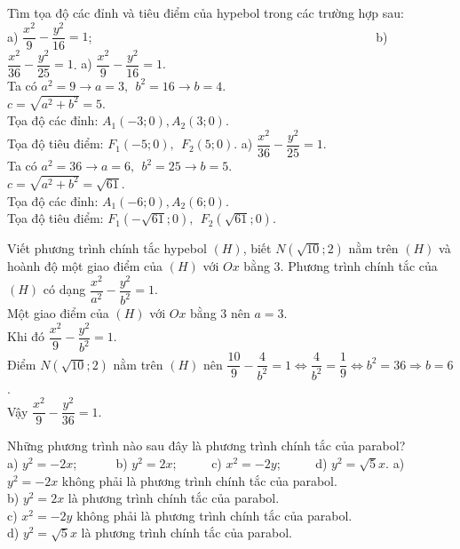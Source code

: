 \begin{bt}
	Tìm tọa độ các đỉnh và tiêu điểm của hypebol trong các trường hợp sau:\\
	a) $\dfrac{x^2}{9}-\dfrac{y^2}{16}=1$;~~~~~~~~~~~~~~~~~~~~~~~~~~~~~~~~~~~~~~~~~~~~~
	b) $\dfrac{x^2}{36}-\dfrac{y^2}{25}=1$.
	\loigiai 
	{
		a) $\dfrac{x^2}{9}-\dfrac{y^2}{16}=1$.\\
		Ta có $a^2=9\rightarrow a=3,  ~~b^2=16 \rightarrow b=4$.\\
		$c=\sqrt{a^2+b^2}=5$.\\
		Tọa độ các đỉnh: $A_1(-3;0), A_2(3;0)$.\\
		Tọa độ tiêu điểm: $F_1(-5;0),~~F_2(5;0)$.
		a) $\dfrac{x^2}{36}-\dfrac{y^2}{25}=1$.\\
		Ta có $a^2=36\rightarrow a=6,  ~~b^2=25 \rightarrow b=5$.\\
		$c=\sqrt{a^2+b^2}=\sqrt{61}$.\\
		Tọa độ các đỉnh: $A_1(-6;0), A_2(6;0)$.\\
		Tọa độ tiêu điểm: $F_1(-\sqrt{61};0),~~F_2(\sqrt{61};0)$.
	}
\end{bt}
\begin{bt}
	Viết phương trình chính tắc hypebol $(H)$, biết $N(\sqrt{10};2)$ nằm trên $(H)$ và hoành độ một giao điểm của $(H)$ với $Ox$ bằng $3$.
	\loigiai 
	{
		Phương trình chính tắc của $(H)$ có dạng $\dfrac{x^2}{a^2}-\dfrac{y^2}{b^2}=1$.\\
		Một giao điểm của $(H)$ với $Ox$ bằng $3$ nên $a=3$.\\
		Khi đó $\dfrac{x^2}{9}-\dfrac{y^2}{b^2}=1$.\\
		Điểm $N(\sqrt{10};2)$ nằm trên $(H)$ nên $\dfrac{10}{9}-\dfrac{4}{b^2}=1 \Leftrightarrow \dfrac{4}{b^2}=\dfrac{1}{9}\Leftrightarrow b^2=36 \Rightarrow b=6$.\\
		Vậy $\dfrac{x^2}{9}-\dfrac{y^2}{36}=1$.
	}
\end{bt}
\begin{bt}
	Những phương trình nào sau đây là phương trình chính tắc của parabol?\\	
	a) $y^2=-2x$; ~~~~~
	b) $y^2=2x$;~~~~~
	c) $x^2=-2y$;~~~~~
	d) $y^2=\sqrt{5}x$.
	\loigiai 
	{
		a) $y^2=-2x$ không phải là phương trình chính tắc của parabol.\\
		b) $y^2=2x$ là phương trình chính tắc của parabol.\\
		c) $x^2=-2y$ không phải là phương trình chính tắc của parabol.\\
		d) $y^2=\sqrt{5}x$ là phương trình chính tắc của parabol.
	}
\end{bt}
